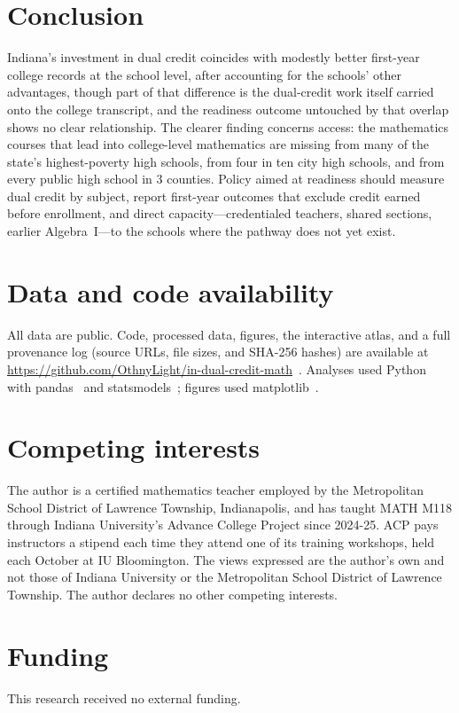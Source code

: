 \documentclass[aps,prd,reprint,superscriptaddress,nofootinbib,floatfix]{revtex4-2}
\begin{document}
\section{Conclusion}\label{sec:conclusion}

Indiana's investment in dual credit coincides with modestly better first-year college records at the school level, after accounting for the schools' other advantages, though part of that difference is the dual-credit work itself carried onto the college transcript, and the readiness outcome untouched by that overlap shows no clear relationship. The clearer finding concerns access: the mathematics courses that lead into college-level mathematics are missing from many of the state's highest-poverty high schools, from four in ten city high schools, and from every public high school in 3 counties. Policy aimed at readiness should measure dual credit by subject, report first-year outcomes that exclude credit earned before enrollment, and direct capacity---credentialed teachers, shared sections, earlier Algebra~I---to the schools where the pathway does not yet exist.

\section*{Data and code availability}
All data are public. Code, processed data, figures, the interactive atlas, and a full provenance log (source URLs, file sizes, and SHA-256 hashes) are available at \url{https://github.com/OthnyLight/in-dual-credit-math}~\cite{repo}. Analyses used Python with pandas~\cite{mckinney2010} and statsmodels~\cite{seabold2010}; figures used matplotlib~\cite{hunter2007}.

\section*{Competing interests}
The author is a certified mathematics teacher employed by the Metropolitan School District of Lawrence Township, Indianapolis, and has taught MATH M118 through Indiana University's Advance College Project since 2024-25. ACP pays instructors a stipend each time they attend one of its training workshops, held each October at IU Bloomington. The views expressed are the author's own and not those of Indiana University or the Metropolitan School District of Lawrence Township. The author declares no other competing interests.

\section*{Funding}
This research received no external funding.
\end{document}
